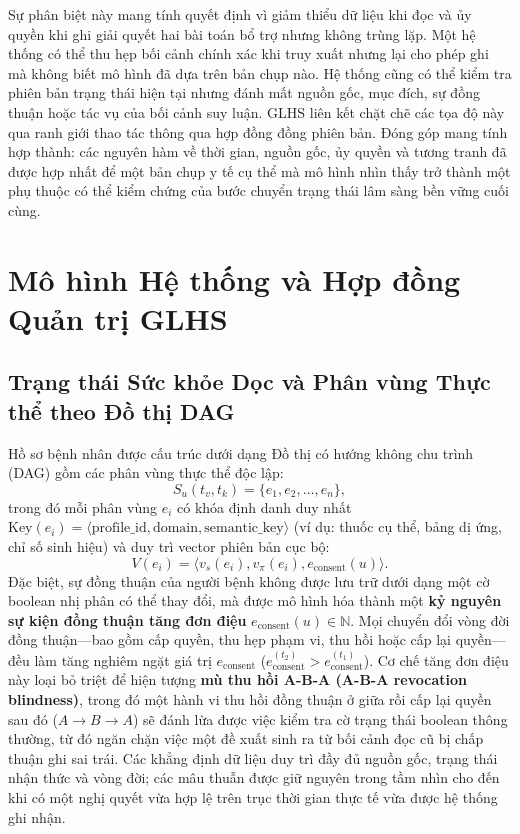 \documentclass[11pt]{article}
\begin{document}
Sự phân biệt này mang tính quyết định vì giảm thiểu dữ liệu khi đọc và ủy quyền khi ghi giải quyết hai bài toán bổ trợ nhưng không trùng lặp. Một hệ thống có thể thu hẹp bối cảnh chính xác khi truy xuất nhưng lại cho phép ghi mà không biết mô hình đã dựa trên bản chụp nào. Hệ thống cũng có thể kiểm tra phiên bản trạng thái hiện tại nhưng đánh mất nguồn gốc, mục đích, sự đồng thuận hoặc tác vụ của bối cảnh suy luận. GLHS liên kết chặt chẽ các tọa độ này qua ranh giới thao tác thông qua hợp đồng đồng phiên bản. Đóng góp mang tính hợp thành: các nguyên hàm về thời gian, nguồn gốc, ủy quyền và tương tranh đã được hợp nhất để một bản chụp y tế cụ thể mà mô hình nhìn thấy trở thành một phụ thuộc có thể kiểm chứng của bước chuyển trạng thái lâm sàng bền vững cuối cùng.

\section{Mô hình Hệ thống và Hợp đồng Quản trị GLHS}

\subsection{Trạng thái Sức khỏe Dọc và Phân vùng Thực thể theo Đồ thị DAG}
Hồ sơ bệnh nhân được cấu trúc dưới dạng Đồ thị có hướng không chu trình (DAG) gồm các phân vùng thực thể độc lập:
\begin{equation}
S_u(t_v, t_k) = \{ e_1, e_2, \dots, e_n \},
\label{eq:state_dag_vi}
\end{equation}
trong đó mỗi phân vùng $e_i$ có khóa định danh duy nhất $\text{Key}(e_i) = \langle \text{profile\_id}, \text{domain}, \text{semantic\_key} \rangle$ (ví dụ: thuốc cụ thể, bảng dị ứng, chỉ số sinh hiệu) và duy trì vector phiên bản cục bộ:
\begin{equation}
V(e_i) = \langle v_s(e_i), v_{\pi}(e_i), e_{\text{consent}}(u) \rangle.
\label{eq:version_vector_vi}
\end{equation}
Đặc biệt, sự đồng thuận của người bệnh không được lưu trữ dưới dạng một cờ boolean nhị phân có thể thay đổi, mà được mô hình hóa thành một \textbf{kỷ nguyên sự kiện đồng thuận tăng đơn điệu} $e_{\text{consent}}(u) \in \mathbb{N}$. Mọi chuyển đổi vòng đời đồng thuận---bao gồm cấp quyền, thu hẹp phạm vi, thu hồi hoặc cấp lại quyền---đều làm tăng nghiêm ngặt giá trị $e_{\text{consent}}$ ($e_{\text{consent}}^{(t_2)} > e_{\text{consent}}^{(t_1)}$). Cơ chế tăng đơn điệu này loại bỏ triệt để hiện tượng \textbf{mù thu hồi A-B-A (A-B-A revocation blindness)}, trong đó một hành vi thu hồi đồng thuận ở giữa rồi cấp lại quyền sau đó ($A \to B \to A$) sẽ đánh lừa được việc kiểm tra cờ trạng thái boolean thông thường, từ đó ngăn chặn việc một đề xuất sinh ra từ bối cảnh đọc cũ bị chấp thuận ghi sai trái. Các khẳng định dữ liệu duy trì đầy đủ nguồn gốc, trạng thái nhận thức và vòng đời; các mâu thuẫn được giữ nguyên trong tầm nhìn cho đến khi có một nghị quyết vừa hợp lệ trên trục thời gian thực tế vừa được hệ thống ghi nhận.
\end{document}
